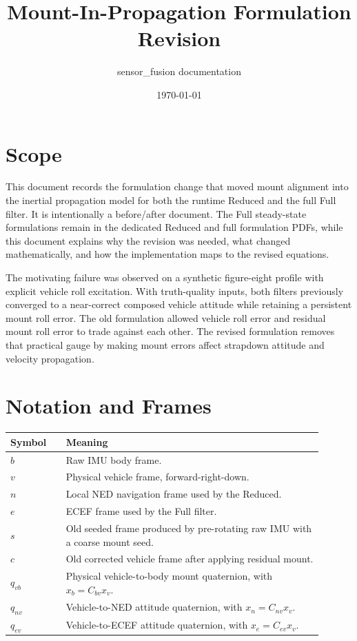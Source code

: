 \documentclass[11pt]{article}
\title{Mount-In-Propagation Formulation Revision}
\author{sensor_fusion documentation}
\date{\today}
\begin{document}
\maketitle
\tableofcontents
\newpage

\section{Scope}

This document records the formulation change that moved mount alignment into
the inertial propagation model for both the runtime Reduced and the full
Full filter. It is intentionally a before/after document. The Full
steady-state formulations remain in the dedicated Reduced and full formulation
PDFs, while this document explains why the revision was needed, what changed
mathematically, and how the implementation maps to the revised equations.

The motivating failure was observed on a synthetic figure-eight profile with
explicit vehicle roll excitation. With truth-quality inputs, both filters
previously converged to a near-correct composed vehicle attitude while retaining
a persistent mount roll error. The old formulation allowed vehicle roll error
and residual mount roll error to trade against each other. The revised
formulation removes that practical gauge by making mount errors affect
strapdown attitude and velocity propagation.

\section{Notation and Frames}

\begin{longtable}{>{\raggedright\arraybackslash}p{0.16\linewidth} >{\raggedright\arraybackslash}p{0.74\linewidth}}
\toprule
\textbf{Symbol} & \textbf{Meaning} \\
\midrule
\(b\) & Raw IMU body frame. \\
\(v\) & Physical vehicle frame, forward-right-down. \\
\(n\) & Local NED navigation frame used by the Reduced. \\
\(e\) & ECEF frame used by the Full filter. \\
\(s\) & Old seeded frame produced by pre-rotating raw IMU with a coarse mount seed. \\
\(c\) & Old corrected vehicle frame after applying residual mount. \\
\(q_{vb}\) & Physical vehicle-to-body mount quaternion, with \(x_b=C_{bv}x_v\). \\
\(q_{nv}\) & Vehicle-to-NED attitude quaternion, with \(x_n=C_{nv}x_v\). \\
\(q_{ev}\) & Vehicle-to-ECEF attitude quaternion, with \(x_e=C_{ev}x_v\). \\
\bottomrule
\end{longtable}
\end{document}
